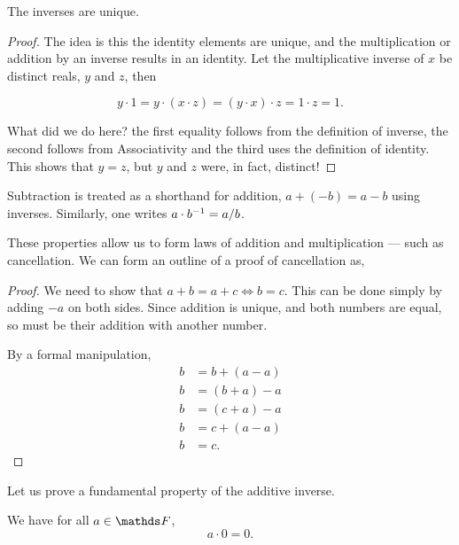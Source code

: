 \begin{proposition}
    The inverses are unique.
\end{proposition}

\begin{proof}
    The idea is this the identity elements are unique, and the multiplication or addition
    by an inverse results in an identity. Let the multiplicative inverse of \(x\) be 
    distinct reals, \(y\) and \(z\), then  

    \begin{equation*}
        y \cdot 1 = y \cdot (x \cdot z) = (y \cdot x) \cdot z = 1 \cdot z = 1.
    \end{equation*}

    What did we do here? the first equality follows from the definition 
    of inverse, the second follows from Associativity and the third uses the 
    definition of identity. This shows that \(y = z\), but \(y\) and \(z\) 
    were, in fact, distinct! \lightning

\end{proof}

Subtraction is treated as a shorthand for addition, \(a + (-b) = a - b\) using 
inverses. Similarly, one writes \(a \cdot b\inv = a/b\).

These properties allow us to form laws of addition and multiplication --- such as 
cancellation. We can form an outline of a proof of cancellation as, 

\begin{proof}
    We need to show that \(a + b = a + c \iff b = c\). 
    This can be done simply by adding \(-a\) on both sides. Since addition is unique, 
    and both numbers are equal, so must be their addition with another number. 
    
    By a formal manipulation,
    \begin{align*}
        b &= b + (a - a) \\
        b &= (b + a) - a \\
        b &= (c + a) - a \\
        b &= c + (a - a)\\
        b &= c.
    \end{align*}
\end{proof}

Let us prove a fundamental property of the additive inverse.

\begin{proposition}
    We have for all \(a \in \FF\), 
    \begin{equation*}
        a \cdot 0 = 0.
    \end{equation*}
\end{proposition}

